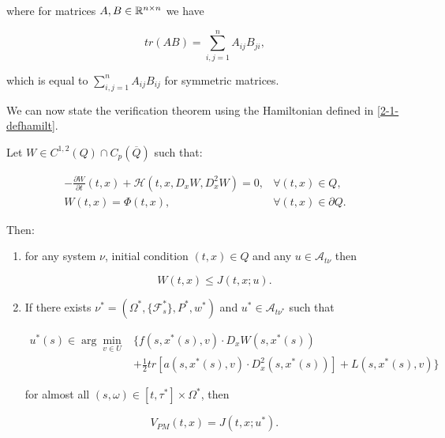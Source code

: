where for matrices $A,B\in\mathbb{R}^{n\times n}$ we have

\begin{equation*}
    tr\left(AB\right) = \sum_{i,j=1}^n A_{ij}B_{ji}, 
\end{equation*}

which is equal to $\sum_{i,j=1}^n A_{ij}B_{ij}$ for symmetric matrices.

We can now state the verification theorem using the Hamiltonian defined in \eqref{2-1-defhamilt}.

\begin{theorem}
    Let $W\in C^{1,2}(Q)\cap C_p(\overline{Q})$ such that:

    \begin{align}\label{2-1-hamilcond}
        -\frac{\partial W}{\partial t}(t,x) + \mathcal{H}(t,x,D_xW,D_x^2W) = 0, & \forall(t,x)\in Q, \\
        W(t,x) = \Phi(t,x), & \forall(t,x)\in\partial Q.
    \end{align}

    Then:

    \begin{enumerate}
        \item for any system $\nu$, initial condition $(t,x)\in Q$ and any $u\in \mathcal{A}_{t\nu}$ then
        
        \begin{equation*}
            W(t,x) \leq J(t,x;u).
        \end{equation*}

        \item If there exists $\nu^{\ast}=(\Omega^{\ast},\{\mathcal{F}_s^{\ast}\},P^{\ast},w^{\ast})$ and $u^{\ast}\in\mathcal{A}_{t\nu^{\ast}}$ such that
        
        \begin{align*}
            u^{\ast}(s) \in \arg\min_{v\in U} & \Bigg\{f(s,x^{\ast}(s),v) \cdot D_xW(s,x^{\ast}(s)) \\
            & + \frac{1}{2}tr\left[a(s,x^{\ast}(s),v)\cdot D_x^2(s,x^{\ast}(s))\right] + L(s,x^{\ast}(s),v)\Bigg\}
        \end{align*}

        for almost all $(s,\omega)\in[t,\tau^{\ast}]\times\Omega^{\ast}$, then

        \begin{equation*}
            V_{PM}(t,x) = J(t,x;u^{\ast}).
        \end{equation*}
    \end{enumerate}


\end{theorem}
